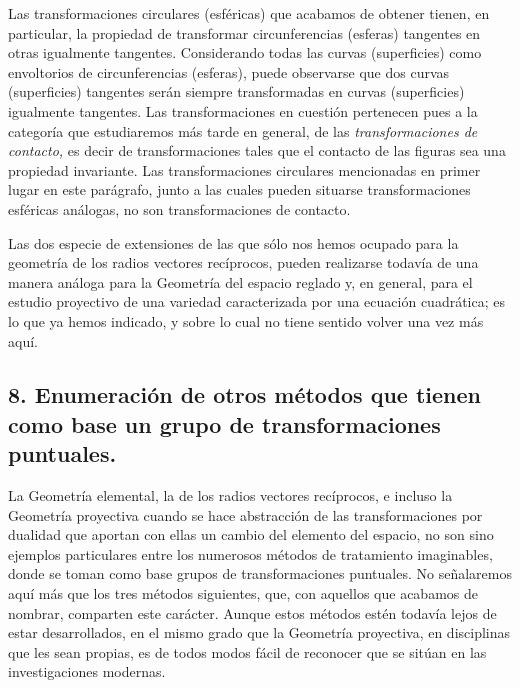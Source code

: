 \documentclass[a4paper, 12pt]{article}
\begin{document}
Las transformaciones circulares (esféricas) que acabamos de obtener tienen, en particular, la propiedad de transformar circunferencias (esferas) tangentes en otras igualmente tangentes. Considerando todas las curvas (superficies) como envoltorios de circunferencias (esferas), puede observarse que dos curvas (superficies) tangentes serán siempre transformadas en curvas (superficies) igualmente tangentes. Las transformaciones en cuestión pertenecen pues a la categoría que estudiaremos más tarde en general, de las \textit{transformaciones de contacto, }es decir de transformaciones tales que el contacto de las figuras sea una propiedad invariante. Las transformaciones circulares mencionadas en primer lugar en este parágrafo, junto a las cuales pueden situarse transformaciones esféricas análogas, no son transformaciones de contacto.

Las dos especie de extensiones de las que sólo nos hemos ocupado para la geometría de los radios vectores recíprocos, pueden realizarse todavía de una manera análoga para la Geometría del espacio reglado y, en general, para el estudio proyectivo de una variedad caracterizada por una ecuación cuadrática; es lo que ya hemos indicado, y sobre lo cual no tiene sentido volver una vez más aquí. 



\subsection*{8. Enumeración de otros métodos que tienen como base un grupo de transformaciones puntuales.}

La Geometría elemental, la de los radios vectores recíprocos, e incluso la Geometría proyectiva cuando se hace abstracción de las transformaciones por dualidad que aportan con ellas un cambio del elemento del espacio, no son sino ejemplos particulares entre los numerosos métodos de tratamiento imaginables, donde se toman como base grupos de transformaciones puntuales. No señalaremos aquí más que los tres métodos siguientes, que, con aquellos que acabamos de nombrar, comparten este carácter. Aunque estos métodos estén todavía lejos de estar desarrollados, en el mismo grado que la Geometría proyectiva, en disciplinas que les sean propias, es de todos modos fácil de reconocer que se sitúan en las investigaciones modernas.
\end{document}

